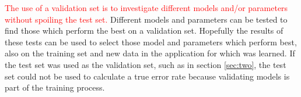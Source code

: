 \documentclass[a4paper,11pt]{article}
\newcommand{\highlightColor}{red}
\begin{document}
\begin{enumerate}
\textcolor{\highlightColor}{ 
The use of a validation set is to investigate different models and/or
parameters without spoiling the test set.}
Different models and parameters can be tested to find those which perform the best on a validation 
set.  Hopefully the results of these tests can be used to select those 
model and parameters which perform best, also on the training set and new 
data in the application for which was learned.  
If the test set was used as the validation set, such 
as in section \ref{sec:two}, the test set could not be used to calculate a 
true error rate because validating models is part of the training process.  

\end{enumerate}
\end{document}
